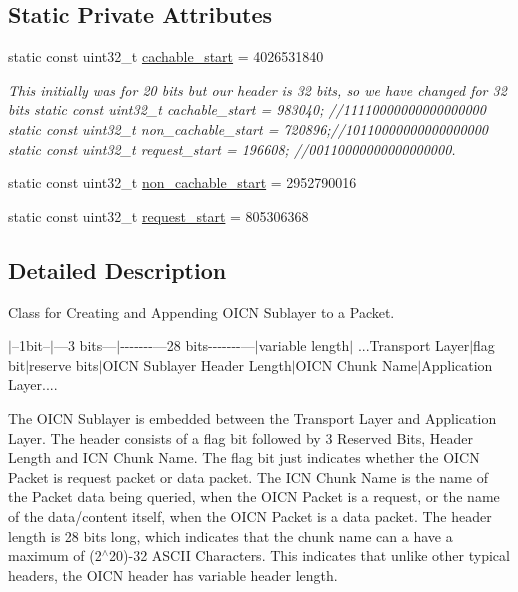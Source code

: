 \subsection*{Static Private Attributes}
\begin{DoxyCompactItemize}
\item 
static const uint32\-\_\-t \hyperlink{classns3_1_1OICNHeader_a634bc285b730e2c64e97f7a5477e3baf}{cachable\-\_\-start} = 4026531840
\begin{DoxyCompactList}\small\item\em This initially was for 20 bits but our header is 32 bits, so we have changed for 32 bits static const uint32\-\_\-t cachable\-\_\-start = 983040; //11110000000000000000 static const uint32\-\_\-t non\-\_\-cachable\-\_\-start = 720896;//10110000000000000000 static const uint32\-\_\-t request\-\_\-start = 196608; //00110000000000000000. \end{DoxyCompactList}\item 
static const uint32\-\_\-t \hyperlink{classns3_1_1OICNHeader_a063e2606d1ed5d6544d5e5e261d04766}{non\-\_\-cachable\-\_\-start} = 2952790016
\item 
static const uint32\-\_\-t \hyperlink{classns3_1_1OICNHeader_aeed02f735f48273c72dc5947f2707d62}{request\-\_\-start} = 805306368
\end{DoxyCompactItemize}


\subsection{Detailed Description}
Class for Creating and Appending O\-I\-C\-N Sublayer to a Packet. 

$\vert$--1bit--$\vert$---3 bits---$\vert$-\/-\/-\/-\/-\/-\/-\/---28 bits-\/-\/-\/-\/-\/-\/-\/---$\vert$variable length$\vert$ ...Transport Layer$\vert$flag bit$\vert$reserve bits$\vert$\-O\-I\-C\-N Sublayer Header Length$\vert$\-O\-I\-C\-N Chunk Name$\vert$\-Application Layer....

The O\-I\-C\-N Sublayer is embedded between the Transport Layer and Application Layer. The header consists of a flag bit followed by 3 Reserved Bits, Header Length and I\-C\-N Chunk Name. The flag bit just indicates whether the O\-I\-C\-N Packet is request packet or data packet. The I\-C\-N Chunk Name is the name of the Packet data being queried, when the O\-I\-C\-N Packet is a request, or the name of the data/content itself, when the O\-I\-C\-N Packet is a data packet. The header length is 28 bits long, which indicates that the chunk name can a have a maximum of (2$^\wedge$20)-\/32 A\-S\-C\-I\-I Characters. This indicates that unlike other typical headers, the O\-I\-C\-N header has variable header length.

